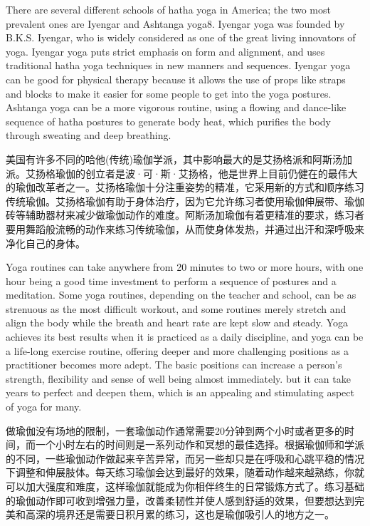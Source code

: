 \documentclass[cs4size, a4paper,12pt]{article}
\newcounter{numpar}
\newcommand*{\newpar}{\numpar{}}
\begin{document}
\newpar There are several different schools of hatha yoga in America; the two most prevalent ones are Iyengar and Ashtanga yoga8. Iyengar yoga was founded by B.K.S. Iyengar, who is widely considered as one of the great living innovators of yoga. Iyengar yoga puts strict emphasis on form and alignment, and uses traditional hatha yoga techniques in new manners and sequences. Iyengar yoga can be good for physical therapy because it allows the use of props like straps and blocks to make it easier for some people to get into the yoga postures. Ashtanga yoga can be a more vigorous routine, using a flowing and dance-like sequence of hatha postures to generate body heat, which purifies the body through sweating and deep breathing.

美国有许多不同的哈他(传统)瑜伽学派，其中影响最大的是艾扬格派和阿斯汤加派。艾扬格瑜伽的创立者是波·可·斯·艾扬格，他是世界上目前仍健在的最伟大的瑜伽改革者之一。艾扬格瑜伽十分注重姿势的精准，它采用新的方式和顺序练习传统瑜伽。艾扬格瑜伽有助于身体治疗，因为它允许练习者使用瑜伽伸展带、瑜伽砖等辅助器材来减少做瑜伽动作的难度。阿斯汤加瑜伽有着更精准的要求，练习者要用舞蹈般流畅的动作来练习传统瑜伽，从而使身体发热，并通过出汗和深呼吸来净化自己的身体。

\newpar Yoga routines can take anywhere from 20 minutes to two or more hours, with one hour being a good time investment to perform a sequence of postures and a meditation. Some yoga routines, depending on the teacher and school, can be as strenuous as the most difficult workout, and some routines merely stretch and align the body while the breath and heart rate are kept slow and steady. Yoga achieves its best results when it is practiced as a daily discipline, and yoga can be a life-long exercise routine, offering deeper and more challenging positions as a practitioner becomes more adept. The basic positions can increase a person's strength, flexibility and sense of well being almost immediately.  but it can take years to perfect and deepen them, which is an appealing and stimulating aspect of yoga for many.

做瑜伽没有场地的限制，一套瑜伽动作通常需要20分钟到两个小时或者更多的时间，而一个小时左右的时间则是一系列动作和冥想的最佳选择。根据瑜伽师和学派的不同，一些瑜伽动作做起来辛苦异常，而另一些却只是在呼吸和心跳平稳的情况下调整和伸展肢体。每天练习瑜伽会达到最好的效果，随着动作越来越熟练，你就可以加大强度和难度，这样瑜伽就能成为你相伴终生的日常锻炼方式了。练习基础的瑜伽动作即可收到增强力量，改善柔韧性并使人感到舒适的效果，但要想达到完美和高深的境界还是需要日积月累的练习，这也是瑜伽吸引人的地方之一。
\end{document}
